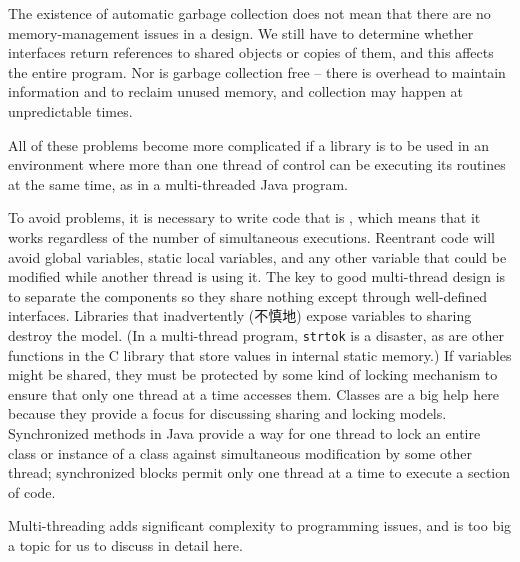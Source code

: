 The existence of automatic garbage collection does not mean that there are
no memory-management issues in a design. We still have to determine whether
interfaces return references to shared objects or copies of them, and this
affects the entire program. Nor is garbage collection free -- there is
overhead to maintain information and to reclaim unused memory, and
collection may happen at unpredictable times.

All of these problems become more complicated if a library is to be used in
an environment where more than one thread of control can be executing its
routines at the same time, as in a multi-threaded Java program.

To avoid problems, it is necessary to write code that is ,
which means that it works regardless of the number of simultaneous
executions.  Reentrant code will avoid global variables, static local
variables, and any other variable that could be modified while another
thread is using it. The key to good multi-thread design is to separate the
components so they share nothing except through well-defined interfaces.
Libraries that inadvertently (不慎地) expose variables to sharing destroy
the model.  (In a multi-thread program, \verb'strtok' is a disaster, as are
other functions in the C library that store values in internal static
memory.) If variables might be shared, they must be protected by some kind
of locking mechanism to ensure that only one thread at a time accesses
them. Classes are a big help here because they provide a focus for
discussing sharing and locking models. Synchronized methods in Java provide
a way for one thread to lock an entire class or instance of a class against
simultaneous modification by some other thread; synchronized blocks permit
only one thread at a time to execute a section of code.

Multi-threading adds significant complexity to programming issues, and is
too big a topic for us to discuss in detail here.
